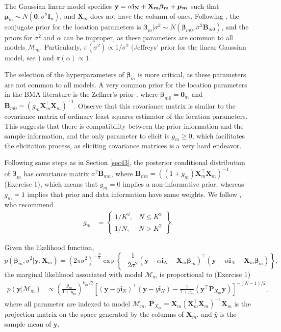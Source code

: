 The Gaussian linear model specifies $\bf{y}=\alpha\bm{i}_N+\bm{X}_m\bm{\beta}_m+\bm{\mu}_m$ such that $\bm{\mu}_m\sim{N}(\bm{0},\sigma^2\bm{I}_n)$, and $\bm{X}_m$ does not have the column of ones. Following \cite{koop2003bayesian}, the conjugate prior for the location parameters is $\bm{\beta}_m|\sigma^2 \sim {N}(\bm{\beta}_{m0}, \sigma^2 \bm{B}_{m0})$, and the priors for $\sigma^2$ and $\alpha$ can be improper, as these parameters are common to all models $\mathcal{M}_m$. Particularly, $\pi(\sigma^2)\propto 1/\sigma^2$ (Jeffreys' prior for the linear Gaussian model, see \cite{prior1991bayesian}) and $\pi(\alpha)\propto 1$.

The selection of the hyperparameters of $\bm{\beta}_m$ is more critical, as these parameters are not common to all models. A very common prior for the location parameters in the BMA literature is the Zellner's prior \cite{zellner1986assessing}, where $\bm{\beta}_{m0}=\bm{0}_m$ and $\bm{B}_{m0}=(g_m\bm{X}_m^{\top}\bm{X}_m)^{-1}$. Observe that this covariance matrix is similar to the covariance matrix of ordinary least squares estimator of the location parameters. This suggests that there is compatibility between the prior information and the sample information, and the only parameter to elicit is $g_m\geq 0$, which facilitates the elicitation process, as eliciting covariance matrices is a very hard endeavor.

Following same steps as in Section \ref{sec43}, the posterior conditional distribution of $\bm{\beta}_m$ has covariance matrix $\sigma^2\bm{B}_{mn}$, where $\bm{B}_{mn}=((1+g_m)\bm{X}_m^{\top}\bm{X}_m)^{-1}$ (Exercise 1), which means that $g_m=0$ implies a non-informative prior, whereas $g_m=1$ implies that prior and data information have same weights. We follow \cite{fernandez2001benchmark}, who recommend
\begin{align*}
	g_m & =
	\begin{Bmatrix}
		1/K^2, & N \leq K^2\\
		1/N, & N>K^2 
	\end{Bmatrix}.
\end{align*}  
 
Given the likelihood function, 
\begin{equation*}
	p(\bm{\beta}_m, \sigma^2|\bm{y}, \bm{X}_m) = (2\pi\sigma^2)^{-\frac{N}{2}} \exp \left\{-\frac{1}{2\sigma^2} (\bm{y} - \alpha\bm{i}_N - \bm{X}_m\bm{\beta}_m)^{\top}(\bm{y} - \alpha\bm{i}_N - \bm{X}_m\bm{\beta}_m) \right\},
\end{equation*}
the marginal likelihood associated with model $\mathcal{M}_m$ is proportional to (Exercise 1) 
\begin{align*}
	p(\bm{y}|\mathcal{M}_m)&\propto \left(\frac{g_m}{1+g_m}\right)^{k_m/2} \left[(\bm{y}-\bar{y}\bm{i}_N)^{\top}(\bm{y}-\bar{y}\bm{i}_N)-\frac{1}{1+g_m}(\bm{y}^{\top}\bm{P}_{X_m}\bm{y})\right]^{-(N-1)/2},
\end{align*}
where all parameter are indexed to model $\mathcal{M}_m$, $\bm{P}_{X_m}=\bm{X}_m(\bm{X}_m^{\top}\bm{X}_m)^{-1}\bm{X}_m$ is the projection matrix on the space generated by the columns of $\bm{X}_m$, and $\bar{y}$ is the sample mean of $\bm{y}$.

